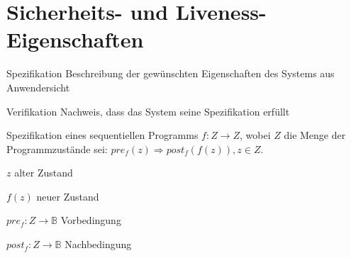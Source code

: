 \section{Sicherheits- und Liveness-Eigenschaften}
\begin{description}
\item {Spezifikation} Beschreibung der gewünschten Eigenschaften des Systems aus Anwendersicht
\item {Verifikation} Nachweis, dass das System seine Spezifikation erfüllt
\end{description}
Spezifikation eines sequentiellen Programms $f: Z \rightarrow Z$, wobei $Z$ die Menge der Programmzustände sei:
$pre_f(z) \Rightarrow post_f(f(z)), z \in Z$.
\begin{description}
\item {$z$} alter Zustand
\item {$f(z)$} neuer Zustand
\item {$pre_f: Z \rightarrow \mathbb{B}$} Vorbedingung
\item {$post_f: Z \rightarrow \mathbb{B}$} Nachbedingung
\end{description}

